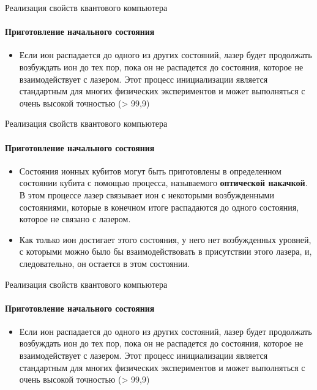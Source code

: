 \documentclass{beamer}
\begin{document}
    \begin{frame}{Реализация свойств квантового компьютера}
    \framesubtitle{Приготовление начального состояния}

    \begin{itemize}
            \item <1-> Если ион распадается до одного из других состояний, лазер будет продолжать возбуждать ион до тех пор, пока он не распадется до состояния, которое не взаимодействует с лазером. Этот процесс инициализации является стандартным для многих физических экспериментов и может выполняться с очень высокой точностью (> 99,9)
    \end{itemize}

    \end{frame}

    \begin{frame}{Реализация свойств квантового компьютера}
    \framesubtitle{Приготовление начального состояния}

    \begin{itemize}
            \item <1-> Состояния ионных кубитов могут быть приготовлены в определенном состоянии кубита с помощью процесса, называемого \textbf{оптической накачкой}. В этом процессе лазер связывает ион с некоторыми возбужденными состояниями, которые в конечном итоге распадаются до одного состояния, которое не связано с лазером.
            \item <2-> Как только ион достигает этого состояния, у него нет возбужденных уровней, с которыми можно было бы взаимодействовать в присутствии этого лазера, и, следовательно, он остается в этом состоянии.
    \end{itemize}


    \end{frame}

    \begin{frame}{Реализация свойств квантового компьютера}
    \framesubtitle{Приготовление начального состояния}

    \begin{itemize}
            \item <1-> Если ион распадается до одного из других состояний, лазер будет продолжать возбуждать ион до тех пор, пока он не распадется до состояния, которое не взаимодействует с лазером. Этот процесс инициализации является стандартным для многих физических экспериментов и может выполняться с очень высокой точностью (> 99,9)
    \end{itemize}

    \end{frame}
\end{document}
